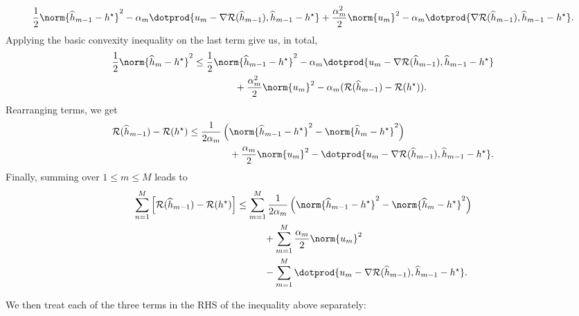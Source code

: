 \begin{equation*}
    \frac{ 1 }{ 2 } \norm{ \hat{ h }_{ m-1 } - \hstar }^2
    - \alpha_{ m } \dotprod{ u_{ m } - \nabla \risk ( \hat{ h }_{ m-1 } ), \hat{ h }_{ m-1 } - \hstar }
    + \frac{ \alpha_{ m }^2 }{ 2 } \norm{ u_{ m } }^2
    - \alpha_{ m } \dotprod{ \nabla \risk ( \hat{ h }_{ m-1 } ), \hat{ h }_{ m-1 } - \hstar }
.\end{equation*}
Applying the basic convexity inequality on the last term give us, in total,
\begin{align*}
    \frac{ 1 }{ 2 } \norm{ \hat{ h }_{ m } - \hstar }^2
    &\leq
    \frac{ 1 }{ 2 } \norm{ \hat{ h }_{ m-1 } - \hstar }^2
    - \alpha_{ m } \dotprod{ u_{ m } - \nabla \risk ( \hat{ h }_{ m-1 } ), \hat{ h }_{ m-1 } - \hstar } \\
    &\hspace{1.5cm}
    + \frac{ \alpha_{ m }^2 }{ 2 } \norm{ u_{ m } }^2
    - \alpha_{ m } ( \risk ( \hat{ h }_{ m-1 } ) - \risk ( \hstar ) )
.\end{align*}
Rearranging terms, we get
\begin{align*}
    \risk ( \hat{ h }_{ m-1 } ) - \risk ( \hstar )
    &\leq
    \frac{ 1 }{ 2 \alpha_{ m } } \left(
        \norm{ \hat{ h }_{ m-1 } - \hstar }^2
        -
        \norm{ \hat{ h }_{ m } - \hstar }^2
    \right) \\
    &\hspace{1.5cm}+ \frac{ \alpha_{ m } }{ 2 } \norm{ u_{ m } }^2
    - \dotprod{ u_{ m } - \nabla \risk ( \hat{ h }_{ m-1 } ), \hat{ h }_{ m-1 } - \hstar }
.\end{align*}
Finally, summing over $ 1 \leq m \leq M $ leads to
\begin{align*}
    \sum_{ n=1 }^{ M } \left[
        \risk ( \hat{ h }_{ m-1 } ) - \risk ( \hstar )
    \right]
    &\leq \sum_{ m=1 }^{ M } \frac{ 1 }{ 2 \alpha_{ m } } \left(
        \norm{ \hat{ h }_{ m-1 } - \hstar }^2
        -
        \norm{ \hat{ h }_{ m } - \hstar }^2
    \right) \\
    &\hspace{1cm} + \sum_{ m=1 }^{ M } \frac{ \alpha_{ m } }{ 2 } \norm{ u_{ m } }^2 \\
    &\hspace{1cm} - \sum_{ m=1 }^{ M }
    \dotprod{ u_{ m } - \nabla \risk ( \hat{ h }_{ m-1 } ), \hat{ h }_{ m-1 } - \hstar }
.\end{align*}

We then treat each of the three terms in the RHS of the inequality above separately:

